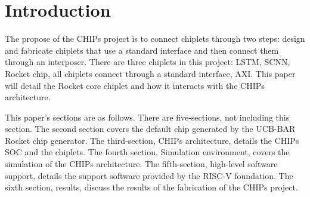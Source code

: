 \documentclass[../main.tex]{subfiles}
\begin{document}
\section{Introduction}
The propose of the CHIPs project is to connect chiplets through two steps: design and fabricate chiplets that use a standard interface and then connect them through an interposer. There are three chiplets in this project: LSTM, SCNN, Rocket chip, all chiplets connect through a standard interface, AXI. This paper will detail the Rocket core chiplet and how it interacts with the CHIPs architecture.

This paper's sections are as follows. There are five-sections, not including this section. The second section covers the default chip generated by the UCB-BAR Rocket chip generator. The third-section, CHIPs architecture, details the CHIPs SOC and the chiplets.  The fourth section, Simulation environment, covers the simulation of the CHIPs architecture. The fifth-section, high-level software support, details the support software provided by the RISC-V foundation. The sixth section, results, discuss the results of the fabrication of the CHIPs project.
\end{document}
